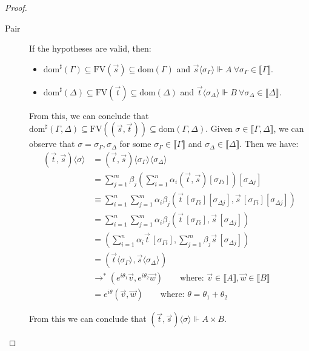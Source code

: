 \documentclass[a4paper,UKenglish,numberwithinsect,pdfa,anonymous]{lipics-v2021}
\theoremstyle{restatestyle}
\newcommand\lra{\longrightarrow}
\newcommand\ansubst[2]{\ensuremath{\langle #1 \rangle_{#2}}}
\newcommand\dom[1]{\mathrm{dom}(#1)}
\newcommand\sdom[1]{\mathrm{dom}^{\sharp}(#1)}
\newcommand\FV[1]{\mathrm{FV}(#1)}
\def\Pair#1#2{(#1,#2)} %
\def\eval{\lra^*}
\def\sem#1{\llbracket#1\rrbracket}
\def\real{\Vdash}
\begin{document}
\begin{proof}
\begin{description}
    \item[Pair] If the hypotheses are valid, then:

    \begin{itemize}
        \item $\sdom{\Gamma}\subseteq \FV{\vec s}\subseteq \dom{\Gamma}$ and $\vec s \ansubst{\sigma_\Gamma}{}\Vdash A\ \forall \sigma_\Gamma\in\sem{\Gamma}$.
        \item $\sdom{\Delta}\subseteq \FV{\vec t}\subseteq \dom{\Delta}$ and $\vec t\ansubst{\sigma_\Delta}{}\Vdash B\ \forall \sigma_\Delta\in\sem{\Delta}$.
    \end{itemize}
    
    From this, we can conclude that $\sdom{\Gamma,\Delta}\subseteq \FV{(\vec s, \vec t)}\subseteq \dom{\Gamma,\Delta}$. Given $\sigma\in\sem{\Gamma,\Delta}$, we can observe that $\sigma=\sigma_\Gamma,\sigma_\Delta$ for some  $\sigma_\Gamma\in\sem{\Gamma}$ and $\sigma_\Delta\in\sem{\Delta}$. Then we have:
    \begin{align*}
        \Pair{\vec{t}}{\vec{s}}\ansubst{\sigma}{} &= \Pair{\vec{t}}{\vec{s}}\ansubst{\sigma_\Gamma}{}\ansubst{\sigma_\Delta}{}\\
        &=\sum_{j=1}^{m} \beta_j (\sum_{i=1}^{n} \alpha_i \Pair{\vec{t}}{\vec{s}}[\sigma_{\Gamma i}])[\sigma_{\Delta j}]\\
        &\equiv\sum_{i=1}^{n}\sum_{j=1}^{m} \alpha_i \beta_j \Pair{\vec{t}\,[\sigma_{\Gamma i}][\sigma_{\Delta j}]}{\vec{s}\,[\sigma_{\Gamma i}][\sigma_{\Delta j}]}\\
        &=\sum_{i=1}^{n}\sum_{j=1}^{m} \alpha_i \beta_j \Pair{\vec{t}\,[\sigma_{\Gamma i}]}{\vec{s}\,[\sigma_{\Delta j}]}\\
        &=\Pair{\sum_{i=1}^{n} \alpha_i \vec{t}\, [\sigma_{\Gamma i}]}{\sum_{j=1}^{m} \beta_j \vec{s}\, [\sigma_{\Delta j}]}\\
        &=\Pair{\vec{t}\ansubst{\sigma_\Gamma}{}}{\vec{s}\ansubst{\sigma_\Delta}{}}\\
        &\eval \Pair{e^{i\theta_1}\vec v}{e^{i\theta_2}\vec w}\qquad\text{where: }\vec{v}\in\sem{A}, \vec{w}\in\sem{B}\\
        &= e^{i\theta} \Pair{\vec{v}}{\vec{w}}\qquad\text{where: }\theta=\theta_1 + \theta_2
    \end{align*}
    
    From this we can conclude that $\Pair{\vec t}{\vec{s}}\ansubst{\sigma}{}\real A\times B$.
    

\end{description}
\end{proof}
\end{document}
